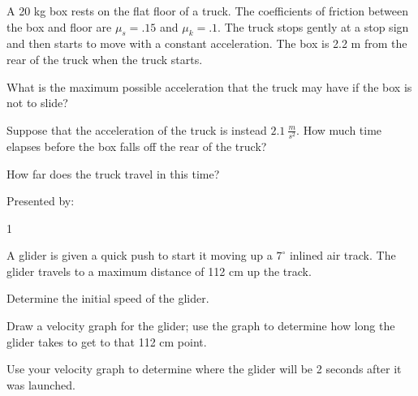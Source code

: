 {\bf \Large{}} A 20 kg box rests on the flat floor of a truck. The coefficients of friction between the box and floor are ${\mu_s=.15}$ and ${\mu_k=.1}$. The truck stops gently at a stop sign and then starts to move with a constant acceleration. The box is 2.2 m from the rear of the truck when the truck starts.

\bigskip
What is the maximum possible acceleration that the truck may have if the box is not to slide?

\vfill
Suppose that the acceleration of the truck is instead ${2.1~\tfrac{m}{s^2}}$. How much time elapses before the box falls off the rear of the truck? 

\vfill
How far does the truck travel in this time?



\vfill
\newpage


\AddToShipoutPicture*{\BackgroundPic}


\bigskip
{\large Presented by: }\underline{\hspace{5cm}}




\vfill
\newpage


\AddToShipoutPicture*{\BackgroundPic}

\addtocounter {ProbNum} {1}

 
{\bf \Large{}} A glider is given a quick push to start it moving up a ${7^{\circ}}$ inlined air track. The glider travels to a maximum distance of 112 cm up the track.

\bigskip
Determine the initial speed of the glider.
 
\vfill
\vfill

Draw a velocity graph for the glider; use the graph to determine how long the glider takes to get to that 112 cm point.
\vfill

Use your velocity graph to determine where the glider will be 2 seconds after it was launched.
\vspace{30 mm}
\newpage

